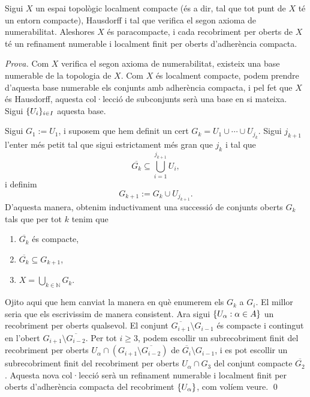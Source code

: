 \begin{lema}\label{lema:paracompact}
    Sigui $X$ un espai topològic localment compacte (és a dir, tal que tot punt de $X$ té un entorn compacte), Hausdorff i tal que verifica el segon axioma de numerabilitat. Aleshores $X$ és paracompacte, i cada recobriment per oberts de $X$ té un refinament numerable i localment finit per oberts d'adherència compacta.
\end{lema}
{\color{green!50!black} \textit{Prova.} Com $X$ verifica el segon axioma de numerabilitat, existeix una base numerable de la topologia de $X$. Com $X$ és localment compacte, podem prendre d'aquesta base numerable els conjunts amb adherència compacta, i pel fet que $X$ és Hausdorff, aquesta col·lecció de subconjunts serà una base en si mateixa. Sigui $\{U_i\}_{i\in I}$ aquesta base.

Sigui $G_1 := U_1$, i suposem que hem definit un cert $G_k=U_1\cup\cdots\cup U_{j_k}$. Sigui $j_{k+1}$ l'enter més petit tal que sigui estrictament més gran que $j_k$ i tal que 
\begin{equation*}
    \overline{G_k}\subseteq \bigcup_{i = 1}^{j_{k+1}} U_i,
\end{equation*}
i definim 
\begin{equation*}
    G_{k+1} := G_k\cup U_{j_{k+1}}.
\end{equation*}
D'aquesta manera, obtenim inductivament una successió de conjunts oberts $G_k$ tals que per tot $k$ tenim que
\begin{enumerate}
    \item $\overline{G_k}$ és compacte,
    \item $\overline{G_k}\subseteq G_{k+1}$,
    \item $X = \bigcup_{k\in\mathbb N} G_k$.
\end{enumerate}
{\color{blue} Ojito aqui que hem canviat la manera en què enumerem els $G_k$ a $G_i$. El millor seria que els escrivissim de manera consistent.}
Ara sigui $\{U_\alpha:\alpha\in A\}$ un recobriment per oberts qualsevol. El conjunt $\overline{G_{i+1}}\setminus G_{i-1}$ és compacte i contingut en l'obert $G_{i+1}\setminus \overline{G_{i-2}}$. Per tot $i\ge3$, podem escollir un subrecobriment finit del recobriment per oberts $U_\alpha\cap(G_{i+1}\setminus \overline{G_{i-2}})$ de $\overline{G_i}\setminus G_{i-1}$, i es pot escollir un subrecobriment finit del recobriment per oberts $U_\alpha\cap G_3$ del conjunt compacte $\overline{G_2}$. Aquesta nova col·lecció serà un refinament numerable i localment finit per oberts d'adherència compacta del recobriment $\{U_\alpha\}$, com volíem veure. \qed
}
